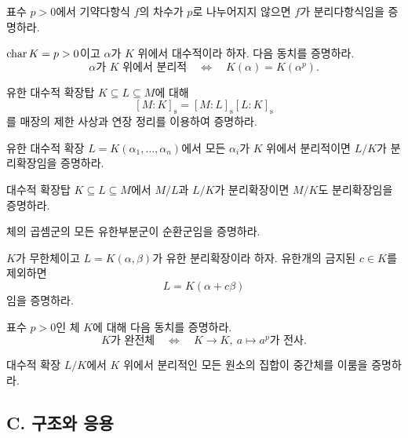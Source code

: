 \begin{exercise}
표수 $p>0$에서 기약다항식 $f$의 차수가 $p$로 나누어지지 않으면 $f$가 분리다항식임을 증명하라.
\end{exercise}

\begin{exercise}[*]
$\operatorname{char} K=p>0$이고 $\alpha$가 $K$ 위에서 대수적이라 하자. 다음 동치를 증명하라.
\[
  \alpha\text{가 }K\text{ 위에서 분리적}
  \quad\Longleftrightarrow\quad
  K(\alpha)=K(\alpha^p).
\]
\end{exercise}

\begin{exercise}[*]
유한 대수적 확장탑 $K\subseteq L\subseteq M$에 대해
\[
  [M:K]_{\mathrm s}
  =[M:L]_{\mathrm s}[L:K]_{\mathrm s}
\]
를 매장의 제한 사상과 연장 정리를 이용하여 증명하라.
\end{exercise}

\begin{exercise}
유한 대수적 확장 $L=K(\alpha_1,\dots,\alpha_n)$에서 모든 $\alpha_i$가 $K$ 위에서 분리적이면 $L/K$가 분리확장임을 증명하라.
\end{exercise}

\begin{exercise}
대수적 확장탑 $K\subseteq L\subseteq M$에서 $M/L$과 $L/K$가 분리확장이면 $M/K$도 분리확장임을 증명하라.
\end{exercise}

\begin{exercise}
체의 곱셈군의 모든 유한부분군이 순환군임을 증명하라.
\end{exercise}

\begin{exercise}[*]
$K$가 무한체이고 $L=K(\alpha,\beta)$가 유한 분리확장이라 하자. 유한개의 금지된 $c\in K$를 제외하면
\[
  L=K(\alpha+c\beta)
\]
임을 증명하라.
\end{exercise}

\begin{exercise}[*]
표수 $p>0$인 체 $K$에 대해 다음 동치를 증명하라.
\[
  K\text{가 완전체}
  \quad\Longleftrightarrow\quad
  K\to K,\ a\mapsto a^p\text{가 전사}.
\]
\end{exercise}

\begin{exercise}
대수적 확장 $L/K$에서 $K$ 위에서 분리적인 모든 원소의 집합이 중간체를 이룸을 증명하라.
\end{exercise}

\subsection*{C. 구조와 응용}

